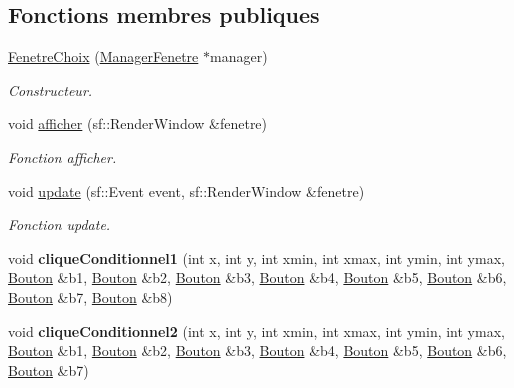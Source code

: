 \subsection*{\-Fonctions membres publiques}
\begin{DoxyCompactItemize}
\item 
\hypertarget{classFenetreChoix_a6a4e020bf1c6cf245fd14dcf07f99caa}{\hyperlink{classFenetreChoix_a6a4e020bf1c6cf245fd14dcf07f99caa}{\-Fenetre\-Choix} (\hyperlink{classManagerFenetre}{\-Manager\-Fenetre} $\ast$manager)}\label{classFenetreChoix_a6a4e020bf1c6cf245fd14dcf07f99caa}

\begin{DoxyCompactList}\small\item\em \-Constructeur. \end{DoxyCompactList}\item 
\hypertarget{classFenetreChoix_a05e6aa6b6fd91b446751c8cb88a1a57a}{void \hyperlink{classFenetreChoix_a05e6aa6b6fd91b446751c8cb88a1a57a}{afficher} (sf\-::\-Render\-Window \&fenetre)}\label{classFenetreChoix_a05e6aa6b6fd91b446751c8cb88a1a57a}

\begin{DoxyCompactList}\small\item\em \-Fonction afficher. \end{DoxyCompactList}\item 
\hypertarget{classFenetreChoix_aab1bddc2946e39272d6c56a0a0065b6b}{void \hyperlink{classFenetreChoix_aab1bddc2946e39272d6c56a0a0065b6b}{update} (sf\-::\-Event event, sf\-::\-Render\-Window \&fenetre)}\label{classFenetreChoix_aab1bddc2946e39272d6c56a0a0065b6b}

\begin{DoxyCompactList}\small\item\em \-Fonction update. \end{DoxyCompactList}\item 
\hypertarget{classFenetreChoix_a0402ba8288130bb9741adff241463c6d}{void {\bfseries clique\-Conditionnel1} (int x, int y, int xmin, int xmax, int ymin, int ymax, \hyperlink{classBouton}{\-Bouton} \&b1, \hyperlink{classBouton}{\-Bouton} \&b2, \hyperlink{classBouton}{\-Bouton} \&b3, \hyperlink{classBouton}{\-Bouton} \&b4, \hyperlink{classBouton}{\-Bouton} \&b5, \hyperlink{classBouton}{\-Bouton} \&b6, \hyperlink{classBouton}{\-Bouton} \&b7, \hyperlink{classBouton}{\-Bouton} \&b8)}\label{classFenetreChoix_a0402ba8288130bb9741adff241463c6d}

\item 
\hypertarget{classFenetreChoix_a5dc40221cb4023dab8142a5fcfad30c1}{void {\bfseries clique\-Conditionnel2} (int x, int y, int xmin, int xmax, int ymin, int ymax, \hyperlink{classBouton}{\-Bouton} \&b1, \hyperlink{classBouton}{\-Bouton} \&b2, \hyperlink{classBouton}{\-Bouton} \&b3, \hyperlink{classBouton}{\-Bouton} \&b4, \hyperlink{classBouton}{\-Bouton} \&b5, \hyperlink{classBouton}{\-Bouton} \&b6, \hyperlink{classBouton}{\-Bouton} \&b7)}\label{classFenetreChoix_a5dc40221cb4023dab8142a5fcfad30c1}


\end{DoxyCompactItemize}
